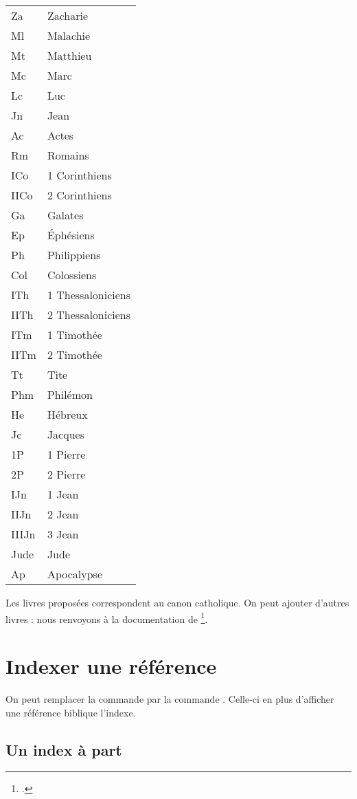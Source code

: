 \begin{longtable}{|l|l|}
Za	&	Zacharie\\
Ml	&	Malachie\\
Mt	&	Matthieu\\
Mc	&	Marc\\
Lc	&	Luc\\
Jn	&	Jean\\
Ac	&	Actes\\
Rm	&	Romains\\
ICo	&	1 Corinthiens\\
IICo	&	2 Corinthiens\\
Ga	&	Galates\\
Ep	&	Éphésiens\\
Ph	&	Philippiens\\
Col	&	Colossiens\\
ITh	&	1 Thessaloniciens\\
IITh	&	2 Thessaloniciens\\
ITm	&	1 Timothée\\
IITm	&	2 Timothée\\
Tt	&	Tite\\
Phm	&	Philémon\\
He	&	Hébreux\\
Jc	&	Jacques\\
1P	&	1 Pierre\\
2P	&	2 Pierre\\
IJn	&	1 Jean\\
IIJn	&	2 Jean\\
IIIJn	&	3 Jean\\
Jude	&	Jude\\
Ap	&	Apocalypse\\
\end{longtable}

\begin{plusloins}
Les livres proposées correspondent au canon catholique. On peut ajouter d'autres livres : nous renvoyons à la documentation de \footcite{bibleref_nouveauxlivres}.


\end{plusloins}

\section{Indexer une référence}

On peut remplacer la commande  par la commande . Celle-ci en plus d'afficher une référence biblique l'indexe.

\subsection{Un index à part}

